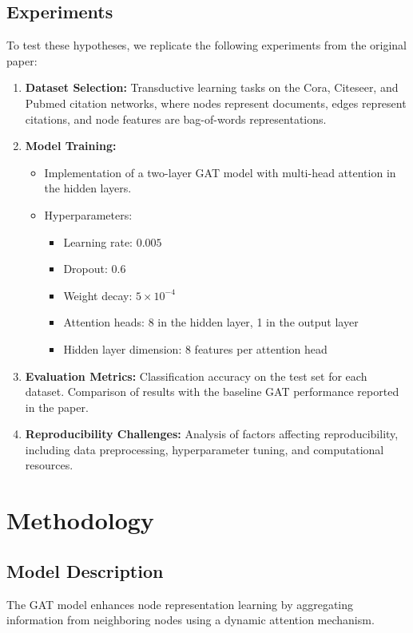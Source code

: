 \documentclass[12pt]{article}
\begin{document}
\subsection{Experiments}
To test these hypotheses, we replicate the following experiments from the original paper:
\begin{enumerate}[leftmargin=1.5em]
    \item \textbf{Dataset Selection:} Transductive learning tasks on the Cora, Citeseer, and Pubmed citation networks, where nodes represent documents, edges represent citations, and node features are bag-of-words representations.
    \item \textbf{Model Training:}
    \begin{itemize}[leftmargin=1.5em]
        \item Implementation of a two-layer GAT model with multi-head attention in the hidden layers.
        \item Hyperparameters:
        \begin{itemize}[leftmargin=1.5em]
            \item Learning rate: \(0.005\)
            \item Dropout: \(0.6\)
            \item Weight decay: \(5 \times 10^{-4}\)
            \item Attention heads: 8 in the hidden layer, 1 in the output layer
            \item Hidden layer dimension: 8 features per attention head
        \end{itemize}
    \end{itemize}
    \item \textbf{Evaluation Metrics:} Classification accuracy on the test set for each dataset. Comparison of results with the baseline GAT performance reported in the paper.
    \item \textbf{Reproducibility Challenges:} Analysis of factors affecting reproducibility, including data preprocessing, hyperparameter tuning, and computational resources.
\end{enumerate}

\section{Methodology}
\subsection{Model Description}
The GAT model enhances node representation learning by aggregating information from neighboring nodes using a dynamic attention mechanism.
\end{document}
